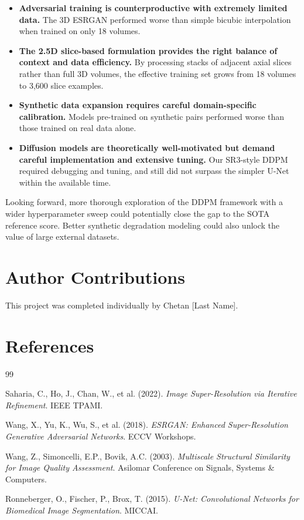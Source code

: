 \documentclass[a4paper,11pt]{article}
\begin{document}
\begin{itemize}
    \item \textbf{Adversarial training is counterproductive with extremely limited data.} The 3D ESRGAN performed worse than simple bicubic interpolation when trained on only 18 volumes.
    \item \textbf{The 2.5D slice-based formulation provides the right balance of context and data efficiency.} By processing stacks of adjacent axial slices rather than full 3D volumes, the effective training set grows from 18 volumes to 3,600 slice examples.
    \item \textbf{Synthetic data expansion requires careful domain-specific calibration.} Models pre-trained on synthetic pairs performed worse than those trained on real data alone.
    \item \textbf{Diffusion models are theoretically well-motivated but demand careful implementation and extensive tuning.} Our SR3-style DDPM required debugging and tuning, and still did not surpass the simpler U-Net within the available time.
\end{itemize}

Looking forward, more thorough exploration of the DDPM framework with a wider hyperparameter sweep could potentially close the gap to the SOTA reference score. Better synthetic degradation modeling could also unlock the value of large external datasets.

\section{Author Contributions}
This project was completed individually by Chetan [Last Name].

\section{References}

\begin{thebibliography}{99}

Saharia, C., Ho, J., Chan, W., et al. (2022). 
\textit{Image Super-Resolution via Iterative Refinement}. IEEE TPAMI.

Wang, X., Yu, K., Wu, S., et al. (2018). 
\textit{ESRGAN: Enhanced Super-Resolution Generative Adversarial Networks}. ECCV Workshops.

Wang, Z., Simoncelli, E.P., Bovik, A.C. (2003). 
\textit{Multiscale Structural Similarity for Image Quality Assessment}. Asilomar Conference on Signals, Systems \& Computers.

Ronneberger, O., Fischer, P., Brox, T. (2015). 
\textit{U-Net: Convolutional Networks for Biomedical Image Segmentation}. MICCAI.

\end{thebibliography}

\end{document}
